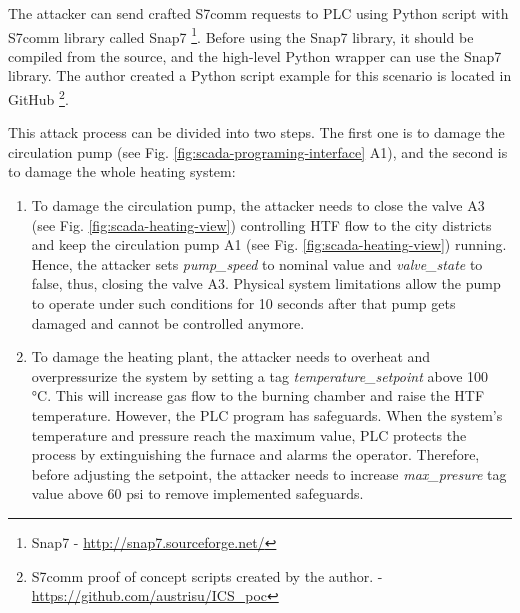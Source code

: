 
The attacker can send crafted S7comm requests to PLC using Python script with S7comm library called Snap7 \footnote{Snap7 - \url{http://snap7.sourceforge.net/}}. Before using the Snap7 library, it should be compiled from the source, and the high-level Python wrapper can use the Snap7 library. The author created a Python script example for this scenario is located in GitHub \footnote{S7comm proof of concept scripts created by the author. - \url{https://github.com/austrisu/ICS_poc}}.

This attack process can be divided into two steps. The first one is to damage the circulation pump (see Fig. \ref{fig:scada-programing-interface} A1), and the second is to damage the whole heating system:

\begin{enumerate}
	\item To damage the circulation pump, the attacker needs to close the valve A3 (see Fig. \ref{fig:scada-heating-view}) controlling HTF flow to the city districts and keep the circulation pump A1 (see Fig. \ref{fig:scada-heating-view}) running. Hence, the attacker sets \textit{pump\_speed} to nominal value and \textit{valve\_state} to false, thus, closing the valve A3. Physical system limitations allow the pump to operate under such conditions for 10 seconds after that pump gets damaged and cannot be controlled anymore.
	
	\item To damage the heating plant, the attacker needs to overheat and overpressurize the system by setting a tag \textit{temperature\_setpoint}  above 100 °C. This will increase gas flow to the burning chamber and raise the HTF temperature. However, the PLC program has safeguards. When the system's temperature and pressure reach the maximum value, PLC protects the process by extinguishing the furnace and alarms the operator. Therefore, before adjusting the setpoint, the attacker needs to increase \textit{max\_presure} tag value above 60 psi to remove implemented safeguards.
\end{enumerate}

